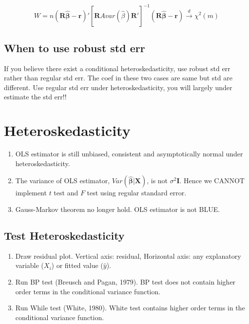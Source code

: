 \documentclass[12pt]{article}
\begin{document}
\begin{equation*}
		W = n(\bm{R  \widehat{\beta} - r})'[\bm{R} \widehat{Avar( \widehat{\beta})}\bm{R}']
^{ - 1}(\bm{R  \widehat{\beta} - r}) \xrightarrow{d} \chi^{2}(m)
\end{equation*}





\subsection{When to use robust std err}
If you believe there exist a conditional heteroskedasticity, use robust std err rather
than regular std err.
The coef in these two cases are same but std are different. Use regular std err under 
heteroskedasticity, you will largely under estimate the std err!!





\section{Heteroskedasticity}


\begin{enumerate}
\item 
OLS estimator is still unbiased, consistent and asymptotically normal under
heteroskedasticity.
\item 
The variance of OLS estimator, $ Var( \widehat{\bm{\beta}}|\bm{X}) $, is not
$ \sigma^{2}\bm{I} $. Hence we CANNOT implement $ t $ test and $ F $ test using 
regular standard error.
\item 
Gauss-Markov theorem no longer hold. OLS estimator is not BLUE.
\end{enumerate}

\subsection{Test Heteroskedasticity}
\begin{enumerate}
\item Draw residual plot. Vertical axis: residual, Horizontal axis: any explanatory
		variable ($ X_{i} $) or fitted value ($  \widehat{y} $).
\item Run BP test (Breusch and Pagan, 1979). BP test does not contain higher order
		terms in the conditional variance function.
\item Run While test (White, 1980). White test contains higher order terms in the
		conditional variance function.
\end{enumerate}
\end{document}
